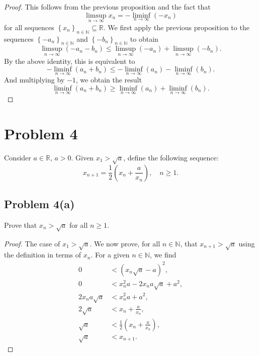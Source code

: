 \documentclass[12pt]{article}
\newenvironment{problem}
    {\begin{lrbox}{\mybox}\begin{minipage}{0.98\textwidth}}
    {\end{minipage}\end{lrbox}\framebox[\textwidth]{\usebox{\mybox}}}
\newcommand{\N}{\mathbb{N}} %
\newcommand{\R}{\mathbb{R}} %
\newcommand{\<}{\left\langle} %
\renewcommand{\>}{\right\rangle} %
\newcommand{\seq}[2][n]{\left\{#2\right\}_{#1\in\N}} %
\begin{document}
\begin{proof}
    This follows from the previous proposition and the fact that
    \[
        \limsup_{n \to \infty} x_n = -\liminf_{n \to \infty}( -x_n)
    \]
    for all sequences $\seq{x_n} \subseteq \R$. We first apply the previous proposition to the sequences $\seq{-a_n}$ and $\seq{-b_n}$ to obtain
    \[
        \limsup_{n \to \infty} (-a_n - b_n) \leq \limsup_{n \to \infty} (-a_n) + \limsup_{n \to \infty} (-b_n).
    \]
    By the above identity, this is equivalent to
    \[
        - \liminf_{n \to \infty} (a_n + b_n) \leq -\liminf_{n\to \infty} (a_n) - \liminf_{n \to \infty} (b_n).
    \]
    And multiplying by $-1$, we obtain the result
    \[
        \liminf_{n \to \infty} (a_n + b_n) \geq \liminf_{n\to \infty} (a_n) + \liminf_{n \to \infty} (b_n).
    \]
    
\end{proof}

\newpage
\section*{Problem 4}
\begin{problem}
    Consider $a\in \R$, $a>0$. Given $x_1>\sqrt{a}$, define the following sequence: 
    \begin{equation}
        x_{n+1} = \frac{1}{2} \left ( x_n + \frac{a}{x_n}\right ),\quad n\ge 1.
    \end{equation}
\end{problem}

\subsection*{Problem 4(a)}
\begin{problem}
    Prove that $x_n > \sqrt{a}$ for all $n\ge 1$.
\end{problem}

\begin{proof}
    The case of $x_1 > \sqrt{a}$. We now prove, for all $n \in \N$, that $x_{n + 1} > \sqrt{a}$ using the definition in terms of $x_n$. For a given $n \in \N$, we find
    \begin{align*}
        0 &< (x_n\sqrt{a} - a)^2, \\
        0 &< x_n^2a - 2x_n a \sqrt{a} + a^2, \\
        2x_n a \sqrt{a} &< x_n^2a + a^2, \\
        2\sqrt{a} &< x_n + \frac{a}{x_n}, \\
        \sqrt{a} &< \frac12 \left( x_n + \frac{a}{x_n} \right),\\
        \sqrt{a} &< x_{n + 1}.
    \end{align*}
    
\end{proof}
\end{document}
